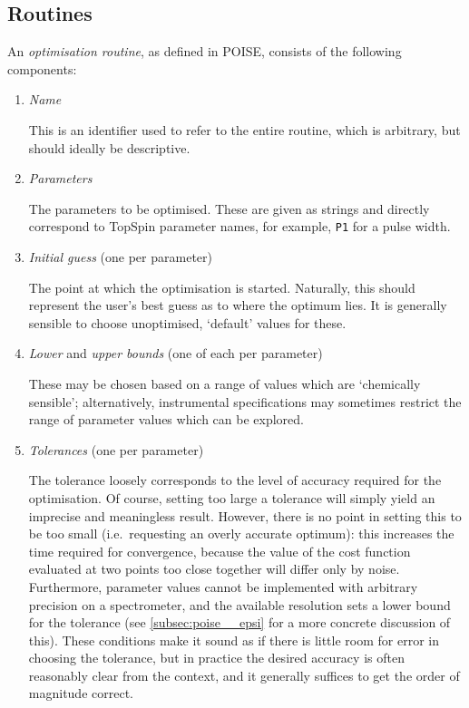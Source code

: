 \subsection{Routines}
\label{subsec:poise__routines}

An \textit{optimisation routine}, as defined in POISE, consists of the following components:

\begin{enumerate}
    \item \textit{Name}

        This is an identifier used to refer to the entire routine, which is arbitrary, but should ideally be descriptive.

    \item \textit{Parameters}

        The parameters to be optimised.
        These are given as strings and directly correspond to TopSpin parameter names, for example, \texttt{P1} for a pulse width.

    \item \textit{Initial guess} (one per parameter)

        The point at which the optimisation is started.
        Naturally, this should represent the user's best guess as to where the optimum lies.
        It is generally sensible to choose unoptimised, `default' values for these.
        
    \item \textit{Lower} and \textit{upper bounds} (one of each per parameter)

        These may be chosen based on a range of values which are `chemically sensible'; alternatively, instrumental specifications may sometimes restrict the range of parameter values which can be explored.

    \item \textit{Tolerances} (one per parameter)

        The tolerance loosely corresponds to the level of accuracy required for the optimisation.
        Of course, setting too large a tolerance will simply yield an imprecise and meaningless result.
        However, there is no point in setting this to be too small (i.e.\ requesting an overly accurate optimum): this increases the time required for convergence, because the value of the cost function evaluated at two points too close together will differ only by noise.
        Furthermore, parameter values cannot be implemented with arbitrary precision on a spectrometer, and the available resolution sets a lower bound for the tolerance (see \cref{subsec:poise__epsi} for a more concrete discussion of this).
        These conditions make it sound as if there is little room for error in choosing the tolerance, but in practice the desired accuracy is often reasonably clear from the context, and it generally suffices to get the order of magnitude correct.


\end{enumerate}
